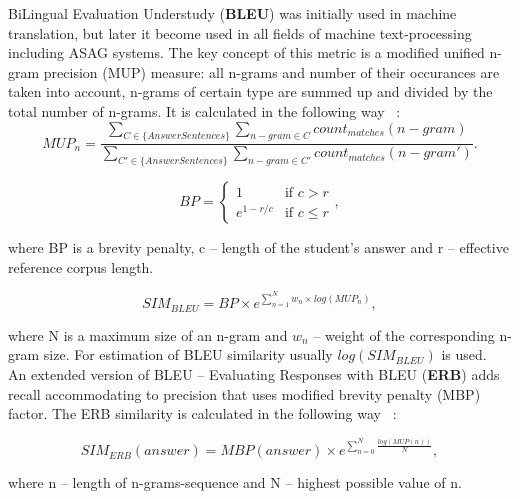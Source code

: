 BiLingual Evaluation Understudy (\textbf{BLEU}) was initially used in machine translation, but later it become used in all fields of machine text-processing including ASAG systems. The key concept of this metric is a modified unified n-gram precision (MUP) measure: all n-grams and number of their occurances are taken into account, n-grams of certain type are summed up and divided by the total number of n-grams. It is calculated in the following way ~\cite{BLEU}:\\

\begin{equation} \label{eq:MUP}
MUP_n = \frac{\sum\limits_{C \in \{AnswerSentences\}} \sum\limits_{n-gram \in C} count_{matches}(n-gram)}{\sum\limits_{C' \in \{AnswerSentences\}} \sum\limits_{n-gram \in C'} count_{matches}(n-gram')}.
\end{equation}

\begin{equation} \label{eq:BP}
BP = \begin{cases}
   1 &\text{if $c>r$}\\
   e^{1-r/c} &\text{if $c \leq r$}
 \end{cases},
\end{equation}

where BP is a brevity penalty, c -- length of the student's answer and r -- effective reference corpus length.

\begin{equation} \label{eq:BLEU}
SIM_{BLEU} = BP \times e^{\sum^N_{n=1}w_n \times log(MUP_n)},
\end{equation}

where N is a maximum size of an n-gram and $w_n$ -- weight of the corresponding n-gram size. For estimation of BLEU similarity usually $log(SIM_{BLEU})$ is used. \\

An extended version of BLEU -- Evaluating Responses with BLEU (\textbf{ERB}) adds recall accommodating to precision that uses modified brevity penalty (MBP) factor. The ERB similarity is calculated in the following way ~\cite{ERB}:

\begin{equation} \label{eq:ERB}
SIM_{ERB}(answer) = MBP(answer)\times e^{\sum^{N}_{n=0}\frac{log(MUP(n))}{N}},
\end{equation}

where n -- length of n-grams-sequence and N -- highest possible value of n. \\

